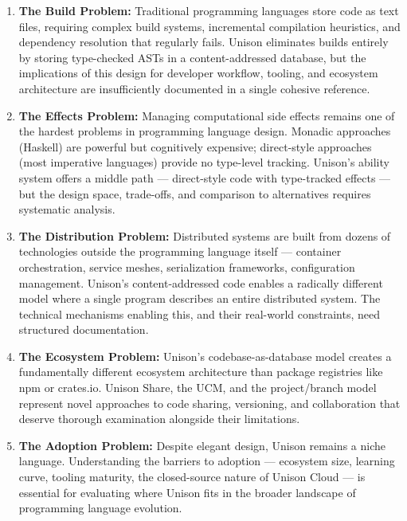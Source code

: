\documentclass[11pt,letterpaper]{article}
\begin{document}
\begin{enumerate}[label=\textbf{\arabic*.}]
  \item \textbf{The Build Problem:} Traditional programming languages store code as text files, requiring complex build systems, incremental compilation heuristics, and dependency resolution that regularly fails. Unison eliminates builds entirely by storing type-checked ASTs in a content-addressed database, but the implications of this design for developer workflow, tooling, and ecosystem architecture are insufficiently documented in a single cohesive reference.

  \item \textbf{The Effects Problem:} Managing computational side effects remains one of the hardest problems in programming language design. Monadic approaches (Haskell) are powerful but cognitively expensive; direct-style approaches (most imperative languages) provide no type-level tracking. Unison's ability system offers a middle path --- direct-style code with type-tracked effects --- but the design space, trade-offs, and comparison to alternatives requires systematic analysis.

  \item \textbf{The Distribution Problem:} Distributed systems are built from dozens of technologies outside the programming language itself --- container orchestration, service meshes, serialization frameworks, configuration management. Unison's content-addressed code enables a radically different model where a single program describes an entire distributed system. The technical mechanisms enabling this, and their real-world constraints, need structured documentation.

  \item \textbf{The Ecosystem Problem:} Unison's codebase-as-database model creates a fundamentally different ecosystem architecture than package registries like npm or crates.io. Unison Share, the UCM, and the project/branch model represent novel approaches to code sharing, versioning, and collaboration that deserve thorough examination alongside their limitations.

  \item \textbf{The Adoption Problem:} Despite elegant design, Unison remains a niche language. Understanding the barriers to adoption --- ecosystem size, learning curve, tooling maturity, the closed-source nature of Unison Cloud --- is essential for evaluating where Unison fits in the broader landscape of programming language evolution.
\end{enumerate}
\end{document}
